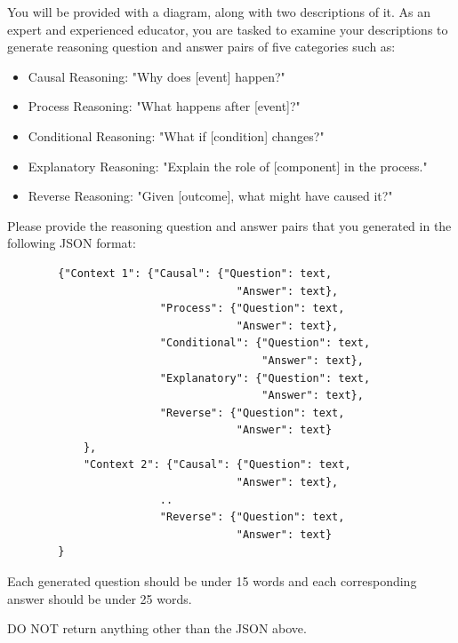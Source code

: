 \centering
\begin{tcolorbox}[
    colback=white,
    colframe=gray!20,
    arc=10pt,
    boxrule=1pt,
    title={\textcolor{white}{\textbf{Prompts for Reasoning QA Generation}}},
    coltitle=white,
    fonttitle=\large,
    colbacktitle=black!70,
]

You will be provided with a diagram, along with two descriptions of it. As an expert and experienced educator, you are tasked to examine your descriptions to generate reasoning question and answer pairs of five categories such as:

\begin{itemize}
    \item Causal Reasoning: "Why does [event] happen?"
    \item Process Reasoning: "What happens after [event]?"
    \item Conditional Reasoning: "What if [condition] changes?"
    \item Explanatory Reasoning: "Explain the role of [component] in the process."
    \item Reverse Reasoning: "Given [outcome], what might have caused it?"
\end{itemize}

Please provide the reasoning question and answer pairs that you generated in the following JSON format:

\begin{verbatim}
        {"Context 1": {"Causal": {"Question": text,
                                    "Answer": text},
                        "Process": {"Question": text,
                                    "Answer": text},	
                        "Conditional": {"Question": text,
                                        "Answer": text},
                        "Explanatory": {"Question": text,
                                        "Answer": text},
                        "Reverse": {"Question": text,
                                    "Answer": text}
            },
            "Context 2": {"Causal": {"Question": text,
                                    "Answer": text},
                        ..
                        "Reverse": {"Question": text,
                                    "Answer": text}
        }
\end{verbatim}

Each generated question should be under 15 words and each corresponding answer should be under 25 words.

DO NOT return anything other than the JSON above.

\end{tcolorbox}


